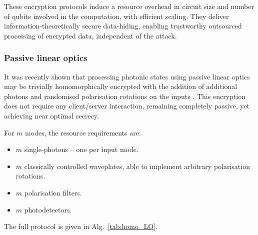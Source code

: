 \documentclass[aps,rmp,twocolumn,amsmath,amssymb,nofootinbib,superscriptaddress,longbibliography,floatfix]{revtex4-1}
\begin{document}
These encryption protocols induce a resource overhead in circuit size and number of qubits involved in the computation, with efficient scaling. They deliver information-theoretically secure data-hiding, enabling trustworthy outsourced processing of encrypted data, independent of the attack.

%
%

\subsubsection{Passive linear optics}

It was recently shown that processing photonic states using passive linear optics may be trivially homomorphically encrypted with the addition of additional photons and randomised polarisation rotations on the inputs \cite{bib:RohdeQWEnc12}. This encryption does not require any client/server interaction, remaining completely passive, yet achieving near optimal secrecy.

For $m$ modes, the resource requirements are:
\begin{itemize}
\item $m$ single-photons -- one per input mode.
\item $m$ classically controlled waveplates, able to implement arbitrary polarisation rotations.
\item $m$ polarisation filters.
\item $m$ photodetectors.
\end{itemize}
The full protocol is given in Alg.~\ref{tab:homo_LO}.
\end{document}
